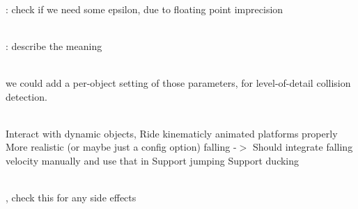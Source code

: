 \begin{DoxyRefList}
\item[Member \doxylink{structbt_connectivity_processor_a5d5f11a5ad2bc3b3bfad6882b42e18de}{bt\+Connectivity\+Processor\+::process\+Triangle} (bt\+Vector3 \texorpdfstring{$\ast$}{*}triangle, int part\+Id, int triangle\+Index)]\hfill \\
\label{todo__todo000014}%
%
\+: check if we need some epsilon, due to floating point imprecision  
\item[Class \doxylink{classbt_default_collision_configuration}{bt\+Default\+Collision\+Configuration} ]\hfill \\
\label{todo__todo000012}%
%
\+: describe the meaning  
\item[Member \doxylink{classbt_default_collision_configuration_a39a173eedf0e8d55dd89ef3b637925a9}{bt\+Default\+Collision\+Configuration\+::set\+Convex\+Convex\+Multipoint\+Iterations} (int num\+Perturbation\+Iterations=3, int minimum\+Points\+Perturbation\+Threshold=3)]\hfill \\
\label{todo__todo000013}%
%
we could add a per-\/object setting of those parameters, for level-\/of-\/detail collision detection.  
\item[Class \doxylink{classbt_kinematic_closest_not_me_ray_result_callback}{bt\+Kinematic\+Closest\+Not\+Me\+Ray\+Result\+Callback} ]\hfill \\
\label{todo__todo000027}%
%
Interact with dynamic objects, Ride kinematicly animated platforms properly More realistic (or maybe just a config option) falling -\/\texorpdfstring{$>$}{>} Should integrate falling velocity manually and use that in  Support jumping Support ducking  
\item[Member \doxylink{classbt_manifold_result_aebe32f0c202d988d0458e88d768602c6}{bt\+Manifold\+Result\+::add\+Contact\+Point} (const bt\+Vector3 \&normal\+On\+BIn\+World, const bt\+Vector3 \&point\+In\+World, \doxylink{bt_scalar_8h_a1e5824cfc8adbf5a77f2622132d16018}{bt\+Scalar} depth)]\hfill \\
\label{todo__todo000015}%
%
, check this for any side effects  
\item[Member \doxylink{classbt_quaternion_a4c5ce0652f1cff12d1981c49b43483f1}{bt\+Quaternion\+::farthest} (const \doxylink{classbt_quaternion}{bt\+Quaternion} \&qd) const]\hfill \\

\end{DoxyRefList}
